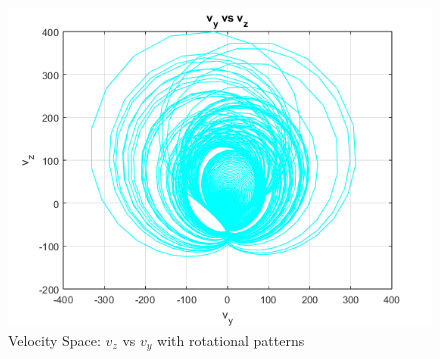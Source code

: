 \documentclass[%
reprint,
amsmath,amssymb,
aps,
floatfix,
]{revtex4-2}
\begin{document}
	\begin{figure}[htbp]
		\centering
		\includegraphics[width=0.8\linewidth]{vz_vs_vy.png}
		\caption{Velocity Space: $v_z$ vs $v_y$ with rotational patterns}
		\label{fig:vz_vy}
	\end{figure}
	
\end{document}
